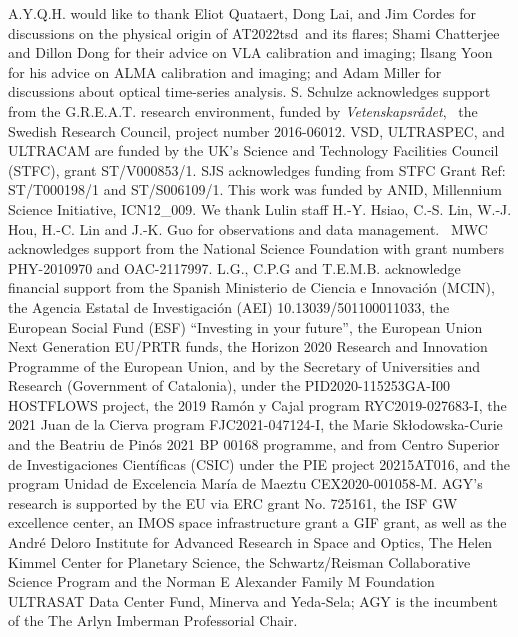 \documentclass{nature_plusfigure}
\newcommand{\at}{AT2022tsd}
\begin{document}
\begin{addendum}

\item A.Y.Q.H. would like to thank Eliot Quataert, Dong Lai, and Jim Cordes for discussions on the physical origin of \at\ and its flares; Shami Chatterjee and Dillon Dong for their advice on VLA calibration and imaging; Ilsang Yoon for his advice on ALMA calibration and imaging; and Adam Miller for discussions about optical time-series analysis.
S. Schulze acknowledges support from the G.R.E.A.T. research environment, funded by {\em Vetenskapsr\aa det},  the Swedish Research Council, project number 2016-06012.
VSD, ULTRASPEC, and ULTRACAM are funded by the UK’s Science and Technology Facilities Council (STFC), grant ST/V000853/1.
SJS acknowledges funding from STFC Grant Ref: ST/T000198/1 and ST/S006109/1.
This work was funded by ANID, Millennium Science Initiative, ICN12\_009.
We thank Lulin staff H.-Y. Hsiao, C.-S. Lin, W.-J. Hou, H.-C. Lin and J.-K. Guo for observations and data management. 
MWC acknowledges support from the National Science Foundation with grant numbers PHY-2010970 and OAC-2117997.
L.G., C.P.G and T.E.M.B. acknowledge financial support from the Spanish Ministerio de Ciencia e Innovaci\'on (MCIN), the Agencia Estatal de Investigaci\'on (AEI) 10.13039/501100011033, the European Social Fund (ESF) “Investing in your future”, the European Union Next Generation EU/PRTR funds, the Horizon 2020 Research and Innovation Programme of the European Union, and by the Secretary of Universities and Research (Government of Catalonia), under the PID2020-115253GA-I00 HOSTFLOWS project, the 2019 Ram\'on y Cajal program RYC2019-027683-I, the 2021 Juan de la Cierva program FJC2021-047124-I, the Marie Skłodowska-Curie and the Beatriu de Pin\'os 2021 BP 00168 programme, and from Centro Superior de Investigaciones Cient\'ificas (CSIC) under the PIE project 20215AT016, and the program Unidad de Excelencia Mar\'ia de Maeztu CEX2020-001058-M.
AGY’s research is supported by the EU via ERC grant No. 725161, the ISF GW excellence center, an IMOS space infrastructure grant  a GIF grant, as well as the André Deloro Institute for Advanced Research in Space and Optics, The Helen Kimmel Center for Planetary Science, the Schwartz/Reisman Collaborative Science Program and the Norman E Alexander Family M Foundation ULTRASAT Data Center Fund, Minerva and Yeda-Sela;  AGY is the incumbent of the The Arlyn Imberman Professorial Chair.

\end{addendum}
\end{document}
